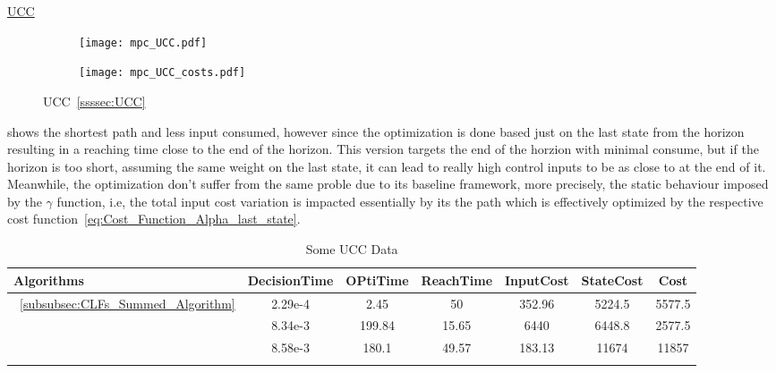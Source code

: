 \underline{UCC}
\label{UCC_other_experiments} %


 \begin{figure}[htbp]
  \begin{subfigure}{0.5\textwidth}
    \centering
    \texttt{[image: mpc\_UCC.pdf]}
  \label{fig:mpc_UCC_CostEvol}
  \end{subfigure}
  \begin{subfigure}{0.6\textwidth}
    \centering
    \texttt{[image: mpc\_UCC\_costs.pdf]}
  \label{fig:mpc_UCC_trajectory}
  \end{subfigure}
  \caption{UCC~\ref{ssssec:UCC}}
\label{fig:mpc_UCCTrajectory_and_CostEvol}
\end{figure}


 shows the shortest path and less input consumed, however since the optimization is done based just on the last state from the horizon resulting in a reaching time close to the end of the horizon. This  version targets the end of the horzion with minimal consume, but if the horizon is too short, assuming the same weight on the last state, it can lead to really high control inputs to be as close to \txtref at the end of it. Meanwhile, the  optimization don't suffer from the same proble due to its baseline framework, more precisely, the static behaviour imposed by the \(\gamma\) function, i.e, the total input cost variation is impacted essentially by its the path which is effectively optimized by the respective cost function~\ref{eq:Cost_Function_Alpha_last_state}.

  \bgroup
 \begin{xltabular}{\textwidth}{|l|cccccc|}
   \toprule
   Algorithms   & DecisionTime & OPtiTime & ReachTime  & InputCost   & StateCost & Cost           \\
   \midrule
    ~\ref{subsubsec:CLFs_Summed_Algorithm}        & 2.29e-4 & 2.45 & 50 & 352.96 & 5224.5 & 5577.5 \\
                                                    & 8.34e-3 & 199.84  & 15.65  & 6440  & 6448.8 & 2577.5 \\
                                                    & 8.58e-3 & 180.1 & 49.57 & 183.13  & 11674  & 11857 \\
    \midrule
    \caption{Some UCC Data}
    \label{tab:Some_mpc_UCC_Data}\\
   \end{xltabular}
 \egroup


